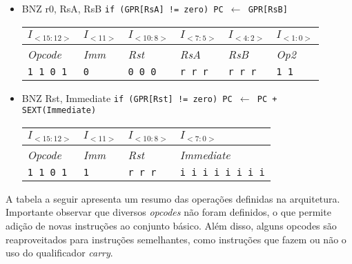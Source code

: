 \documentclass{extreport}
\begin{document}
\begin{itemize}
\item BNZ r0, RsA, RsB
\subitem \texttt{if (GPR[RsA] != zero) PC $\leftarrow$ GPR[RsB]}
\begin{table}[ht!]
\centering
\begin{tabular}{|p{1.6cm}|p{1.6cm}|p{1.6cm}|p{1.6cm}|p{1.6cm}|p{1.6cm}|}
\hline
$I_{<15:12>}$ & $I_{<11>}$ & $I_{<10:8>}$ & $I_{<7:5>}$ & $I_{<4:2>}$ & $I_{<1:0>}$ \\ \hline
\textit{Opcode} & \textit{Imm} & \textit{Rst} & \textit{RsA} & \textit{RsB} & \textit{Op2} \\ \hline
\texttt{1 1 0 1} & \texttt{0} & \texttt{0 0 0} & \texttt{r r r} & \texttt{r r r} & \texttt{1 1} \\ \hline
\end{tabular}
\end{table}

\item BNZ Rst, Immediate
\subitem \texttt{if (GPR[Rst] != zero) PC $\leftarrow$ PC + SEXT(Immediate)}
\begin{table}[ht!]
\centering
\begin{tabular}{|p{1.6cm}|p{1.6cm}|p{1.6cm}|p{5.65cm}|}
\hline
$I_{<15:12>}$ & $I_{<11>}$ & $I_{<10:8>}$ & $I_{<7:0>}$ \\ \hline
\textit{Opcode} & \textit{Imm} & \textit{Rst} & \textit{Immediate} \\ \hline
\texttt{1 1 0 1} & \texttt{1} & \texttt{r r r} & \texttt{i i i i i i i i} \\ \hline
\end{tabular}
\end{table}
\end{itemize}

A tabela a seguir apresenta um resumo das operações definidas na arquitetura. Importante observar que diversos \textit{opcodes} não foram definidos, o que permite adição de novas instruções ao conjunto básico. Além disso, alguns opcodes são reaproveitados para instruções semelhantes, como instruções que fazem ou não o uso do qualificador \textit{carry}.
\end{document}
